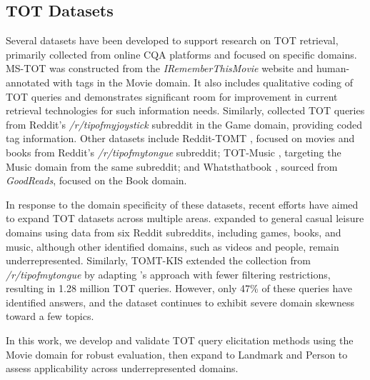 \subsection{TOT Datasets}
Several datasets have been developed to support research on TOT retrieval, primarily collected from online CQA platforms and focused on specific domains. MS-TOT \cite{arguello-movie-identification} was constructed from the \textit{IRememberThisMovie} website and human-annotated with tags in the Movie domain. It also includes qualitative coding of TOT queries and demonstrates significant room for improvement in current retrieval technologies for such information needs. Similarly, \citet{gameTOT} collected TOT queries from Reddit's \textit{/r/tipofmyjoystick} subreddit in the Game domain, providing coded tag information. Other datasets include Reddit-TOMT \cite{Bhargav-2022-wsdm}, focused on movies and books from Reddit's \textit{/r/tipofmytongue} subreddit; TOT-Music \cite{Bhargav23MusicTOT}, targeting the Music domain from the same subreddit; and Whatsthatbook \cite{lin-etal-2023-whatsthatbook}, sourced from \textit{GoodReads}, focused on the Book domain.



In response to the domain specificity of these datasets, recent efforts have aimed to expand TOT datasets across multiple areas. \citet{Meier21-complex-reddit} expanded to general casual leisure domains using data from six Reddit subreddits, including games, books, and music, although other identified domains, such as videos and people, remain underrepresented. Similarly, TOMT-KIS \cite{frobe2023-performance-pred} extended the collection from \textit{/r/tipofmytongue} by adapting \citet{Bhargav-2022-wsdm}'s approach with fewer filtering restrictions, resulting in 1.28 million TOT queries. However, only 47\% of these queries have identified answers, and the dataset continues to exhibit severe domain skewness toward a few topics. 


In this work, we develop and validate TOT query elicitation methods using the Movie domain for robust evaluation, then expand to Landmark and Person to assess applicability across underrepresented domains.


